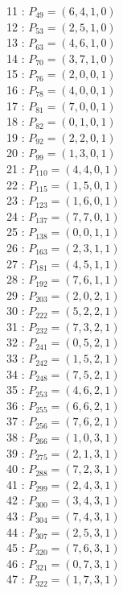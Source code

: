 \documentclass{article}
\begin{document}
{\begin{multicols}{3}
11 : $P_{49}=( 6, 4, 1, 0 )$\\
12 : $P_{53}=( 2, 5, 1, 0 )$\\
13 : $P_{63}=( 4, 6, 1, 0 )$\\
14 : $P_{70}=( 3, 7, 1, 0 )$\\
15 : $P_{76}=( 2, 0, 0, 1 )$\\
16 : $P_{78}=( 4, 0, 0, 1 )$\\
17 : $P_{81}=( 7, 0, 0, 1 )$\\
18 : $P_{82}=( 0, 1, 0, 1 )$\\
19 : $P_{92}=( 2, 2, 0, 1 )$\\
20 : $P_{99}=( 1, 3, 0, 1 )$\\
21 : $P_{110}=( 4, 4, 0, 1 )$\\
22 : $P_{115}=( 1, 5, 0, 1 )$\\
23 : $P_{123}=( 1, 6, 0, 1 )$\\
24 : $P_{137}=( 7, 7, 0, 1 )$\\
25 : $P_{138}=( 0, 0, 1, 1 )$\\
26 : $P_{163}=( 2, 3, 1, 1 )$\\
27 : $P_{181}=( 4, 5, 1, 1 )$\\
28 : $P_{192}=( 7, 6, 1, 1 )$\\
29 : $P_{203}=( 2, 0, 2, 1 )$\\
30 : $P_{222}=( 5, 2, 2, 1 )$\\
31 : $P_{232}=( 7, 3, 2, 1 )$\\
32 : $P_{241}=( 0, 5, 2, 1 )$\\
33 : $P_{242}=( 1, 5, 2, 1 )$\\
34 : $P_{248}=( 7, 5, 2, 1 )$\\
35 : $P_{253}=( 4, 6, 2, 1 )$\\
36 : $P_{255}=( 6, 6, 2, 1 )$\\
37 : $P_{256}=( 7, 6, 2, 1 )$\\
38 : $P_{266}=( 1, 0, 3, 1 )$\\
39 : $P_{275}=( 2, 1, 3, 1 )$\\
40 : $P_{288}=( 7, 2, 3, 1 )$\\
41 : $P_{299}=( 2, 4, 3, 1 )$\\
42 : $P_{300}=( 3, 4, 3, 1 )$\\
43 : $P_{304}=( 7, 4, 3, 1 )$\\
44 : $P_{307}=( 2, 5, 3, 1 )$\\
45 : $P_{320}=( 7, 6, 3, 1 )$\\
46 : $P_{321}=( 0, 7, 3, 1 )$\\
47 : $P_{322}=( 1, 7, 3, 1 )$\\

\end{multicols}}
\end{document}
